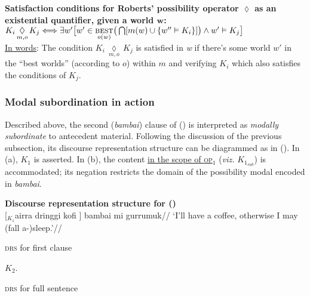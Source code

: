 \ex{}\textbf{Satisfaction conditions for Roberts' possibility operator $ \boldsymbol\lozenge $ as an existential quantifier, given a world $\boldsymbol w $:\\} 
$K_i\,\underset{m,o}{\lozenge}\,K_j \Longleftrightarrow\exists w'\big[w'\in\underset{o(w)}{\textsc{best}}\big(\bigcap[m(w)\cup\{w''\vDash K_i\}]\big) \wedge w'\vDash K_j\big]$\\[6pt]
\underline{In words}: The condition $K_i\,\underset{m,o}{\lozenge}\,K_j$ is satisfied in \textit{w} if there's some world $ w' $ in the ``best worlds'' (according to $ o $) within $ m $ and verifying $ K_i $ which also satisfies the conditions of $ K_j $.\xe

\subsubsection{Modal subordination in action}

Described above, the second (\textit{bambai}) clause of () is interpreted as \textit{modally subordinate} to antecedent material. Following the discussion of the previous subsection, its discourse representation structure can be diagrammed as in (\nextx). In (a), $ K_1 $ is asserted. In (b), the content \ul{in the scope of \textsc{op}$ _1 $} (\textit{viz.} $ \mathit{K_{1_{\text{sub}}}} $) is accommodated; its negation restricts the domain of the possibility modal encoded in \textit{bambai}.

\pex[labeltype=numeric,labelformat=$\mathit K_A.$]{} \textbf{Discourse representation structure for ()}\\
\begingl\gla{} \textup{[$ _\mathit{K_1} $}airra dringgi kofi \textup{]} bambai mi gurrumuk//
\glft`I'll have a coffee, otherwise I may (fall a-)sleep.'//\endgl{}\\
\a \begin{minipage}[t]{.3\textwidth}\textsc{drs} for first clause\\


\end{minipage}$ \mathit{K_2} $.\quad\begin{minipage}[t]{.3\textwidth}\textsc{drs} for full sentence\\
	 	
	 \end{minipage}


